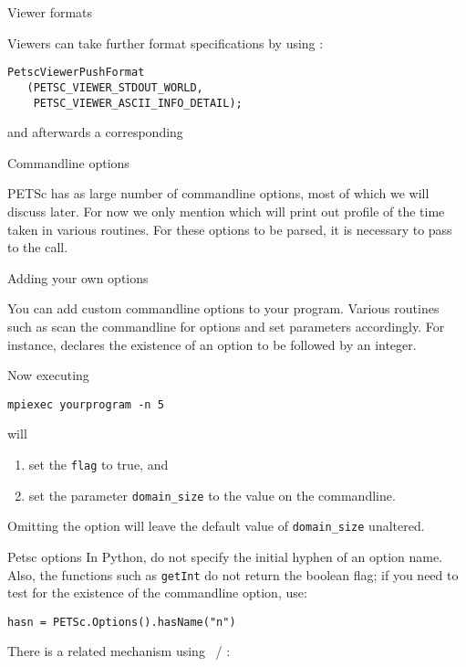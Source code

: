  {Viewer formats}

Viewers can take further format specifications by using
:
\begin{lstlisting}
PetscViewerPushFormat
   (PETSC_VIEWER_STDOUT_WORLD,
    PETSC_VIEWER_ASCII_INFO_DETAIL);
\end{lstlisting}
and afterwards a corresponding 

 {Commandline options}
\label{sec:petsc-options}

PETSc has as large number of commandline options, most of which we
will discuss later. For now we only mention  which
will print out profile of the time taken in various routines.
For these options to be parsed, it is necessary to pass 
to the  call.

 {Adding your own options}

You can add custom 
commandline options to your program.
Various routines such as 
scan the commandline for options and set parameters accordingly.
For instance,
%
%
declares the existence of an option  to be followed by an integer.

Now executing
\begin{verbatim}
mpiexec yourprogram -n 5
\end{verbatim}
will
\begin{enumerate}
\item set the \lstinline{flag} to true, and
\item set the parameter \lstinline{domain_size} to the value on the commandline.
\end{enumerate}
Omitting the  option will leave the default value of \lstinline{domain_size}
unaltered.

\begin{pythonnote}{Petsc options}
  In Python, do not specify the initial hyphen of an option name.
  Also, the functions such as \lstinline{getInt} do not return the boolean flag;
  if you need to test for the existence of the commandline option, use:
\begin{verbatim}
hasn = PETSc.Options().hasName("n")
\end{verbatim}
\end{pythonnote}

There is a related mechanism using
~/ :

